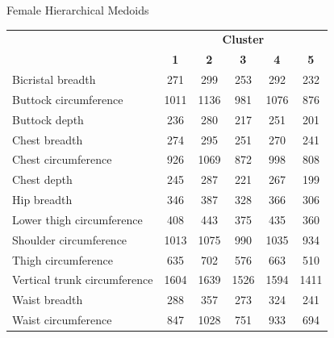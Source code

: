 \documentclass[10pt]{beamer}
\begin{document}
\begin{frame}{Female Hierarchical Medoids}
	\scriptsize
	\centering
	\begin{tabular}{lccccc}
		\cline{2-6}
		                             & \multicolumn{5}{c}{\textbf{Cluster}}                                                     \\
		                             & \textbf{1}                           & \textbf{2} & \textbf{3} & \textbf{4} & \textbf{5} \\
		\hline\hline
		Bicristal breadth            & 271                                  & 299        & 253        & 292        & 232        \\
		Buttock circumference        & 1011                                 & 1136       & 981        & 1076       & 876        \\
		Buttock depth                & 236                                  & 280        & 217        & 251        & 201        \\
		Chest breadth                & 274                                  & 295        & 251        & 270        & 241        \\
		Chest circumference          & 926                                  & 1069       & 872        & 998        & 808        \\
		Chest depth                  & 245                                  & 287        & 221        & 267        & 199        \\
		Hip breadth                  & 346                                  & 387        & 328        & 366        & 306        \\
		Lower thigh circumference    & 408                                  & 443        & 375        & 435        & 360        \\
		Shoulder circumference       & 1013                                 & 1075       & 990        & 1035       & 934        \\
		Thigh circumference          & 635                                  & 702        & 576        & 663        & 510        \\
		Vertical trunk circumference & 1604                                 & 1639       & 1526       & 1594       & 1411       \\
		Waist breadth                & 288                                  & 357        & 273        & 324        & 241        \\
		Waist circumference          & 847                                  & 1028       & 751        & 933        & 694        \\

\end{tabular}
\end{frame}
\end{document}
